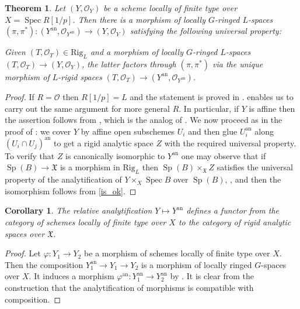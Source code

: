 \documentclass{amsart}
\newtheorem{cor}[prop]{Corollary}
\newtheorem{thm}[prop]{Theorem}
\theoremstyle{definition}
\theoremstyle{remark}
\DeclareMathOperator{\Spec}{Spec}
\DeclareMathOperator{\Sp}{Sp}
\newcommand{\OO}{\mathcal O}
\newcommand{\ana}{\mathrm{an}}
\newcommand{\Rig}{\mathrm{Rig}}
\begin{document}
\begin{thm}\label{universal} Let $(Y, \OO_Y)$ be a scheme locally of finite type over $X=\Spec R[1/p]$. Then there is a 
morphism of locally $G$-ringed  
$L$-spaces $(\pi, \pi^*): (Y^{\ana}, \OO_{Y^{\ana}})\rightarrow (Y, \OO_Y)$ satisfying the
following universal property: 

Given $(T, \OO_T)\in \Rig_L$ and a morphism of locally $G$-ringed $L$-spaces $(T, \OO_T)\rightarrow
(Y, \OO_Y)$, the latter factors through 
$(\pi, \pi^*)$ via the unique morphism of $L$-rigid spaces $(T, \OO_T)\rightarrow (Y^{\ana}, \OO_{Y^{\ana}})$.
\end{thm}
\begin{proof} If $R=\OO$ then $R[1/p]=L$ and the
statement is proved in \cite[Proposition 5.4/4]{bosch}.
 enables us to carry out the same 
argument for more general $R$. In particular, if 
$Y$ is affine then the assertion follows from , which is the analog of \cite[Lemma 5.4/2]{bosch}. We now proceed as in the proof 
of \cite[Proposition 5.4/4]{bosch}: we cover $Y$ by 
affine open subschemes $U_i$ and then glue $U_i^{\ana}$ along $(U_i\cap U_j)^{\ana}$ to get 
a rigid analytic space $Z$ with the required 
universal property. To verify that $Z$ is canonically isomorphic to
$Y^{\ana}$ one may  observe that if $\Sp(B)\rightarrow \mathfrak X$ is 
a morphism in $\Rig_L$ then $\Sp(B)\times_{\mathfrak X} Z$ satisfies the
universal property of the analytification of $Y\times_X \Spec B$ over
$\Sp(B)$, \cite[Satz 1.4]{Koepf}, and then the isomorphism follows
from \eqref{is_ok}.
\end{proof} 
\begin{cor}\label{rel_an_fun} The relative analytification $Y\mapsto Y^{\ana}$ 
defines a functor from the category of schemes locally of finite type over $X$
to the category of rigid analytic spaces over $\mathfrak X$.
\end{cor}
\begin{proof} Let $\varphi: Y_1\rightarrow Y_2$ be a morphism of schemes
locally of finite type over $X$. Then the composition $Y_1^{\ana}\rightarrow 
Y_1 \rightarrow Y_2$ is a morphism of  locally ringed $G$-spaces over $X$. 
It induces a morphism $\varphi^{\ana}: Y_1^{\ana} \rightarrow Y_2^{\ana}$ by . It is clear from the construction that the analytification 
of morphisms is compatible with composition.
\end{proof}
\end{document}
